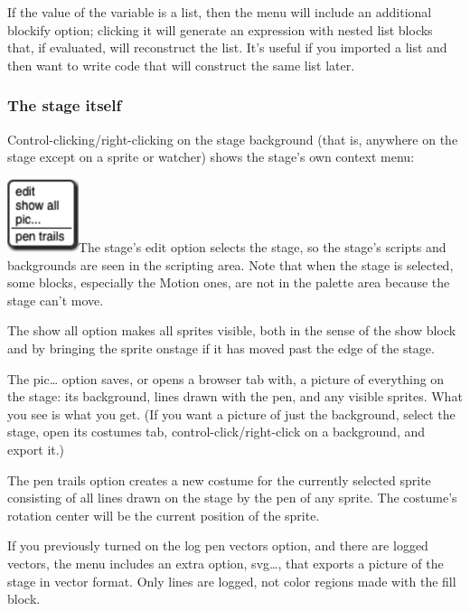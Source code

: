 If the value of the variable is a list, then the menu will include an
additional blockify option; clicking it will generate an expression with
nested list blocks that, if evaluated, will reconstruct the list. It's
useful if you imported a list and then want to write code that will
construct the same list later.

\subsubsection{\texorpdfstring{\hfill\break
The stage itself}{ The stage itself}}\label{the-stage-itself}

Control-clicking/right-clicking on the stage background (that is,
anywhere on the stage except on a sprite or watcher) shows the stage's
own context menu:

\includegraphics[width=0.82153in,height=0.84722in]{media/image1123.png}The
stage's edit option selects the stage, so the stage's scripts and
backgrounds are seen in the scripting area. Note that when the stage is
selected, some blocks, especially the Motion ones, are not in the
palette area because the stage can't move.

The show all option makes all sprites visible, both in the sense of the
show block and by bringing the sprite onstage if it has moved past the
edge of the stage.

The pic\ldots{} option saves, or opens a browser tab with, a picture of
everything on the stage: its background, lines drawn with the pen, and
any visible sprites. What you see is what you get. (If you want a
picture of just the background, select the stage, open its costumes tab,
control-click/right-click on a background, and export it.)

The pen trails option creates a new costume for the currently selected
sprite consisting of all lines drawn on the stage by the pen of any
sprite. The costume's rotation center will be the current position of
the sprite.

If you previously turned on the log pen vectors option, and there are
logged vectors, the menu includes an extra option, svg\ldots, that
exports a picture of the stage in vector format. Only lines are logged,
not color regions made with the fill block.

